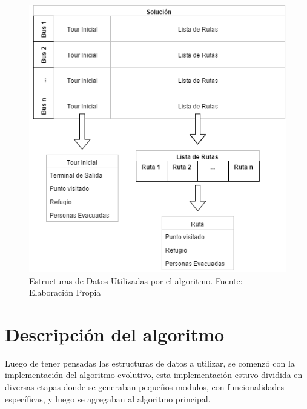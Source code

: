 \documentclass[letter, 10pt]{article}
\begin{document}
\begin{figure}
\centering
\includegraphics[scale=0.5]{Representacion.png}
\caption{Estructuras de Datos Utilizadas por el algoritmo. Fuente: Elaboración Propia}
\label{fig:representacion}
\end{figure}

\section{Descripci\'on del algoritmo}


Luego de tener pensadas las estructuras de datos a utilizar, se comenzó con la implementación del algoritmo evolutivo, esta implementación estuvo dividida en diversas etapas donde se generaban pequeños modulos, con funcionalidades específicas, y luego se agregaban al algoritmo principal.
\end{document}
